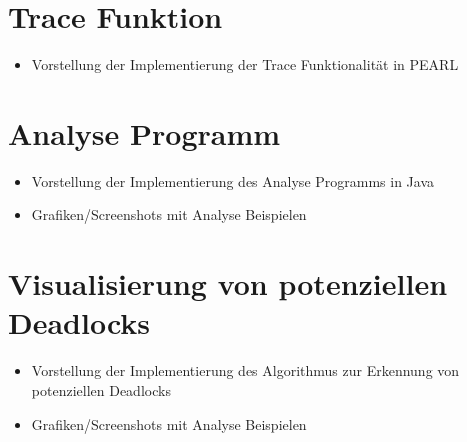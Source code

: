 \section{Trace Funktion}\label{Implementierung:Trace Funktion}
\begin{itemize}
  \item Vorstellung der Implementierung der Trace Funktionalität in PEARL
\end{itemize}

\section{Analyse Programm}
\begin{itemize}
  \item Vorstellung der Implementierung des Analyse Programms in Java
  \item Grafiken/Screenshots mit Analyse Beispielen
\end{itemize}

\section{Visualisierung von potenziellen Deadlocks}
\begin{itemize}
  \item Vorstellung der Implementierung des Algorithmus zur Erkennung von
  potenziellen Deadlocks
  \item Grafiken/Screenshots mit Analyse Beispielen
\end{itemize}